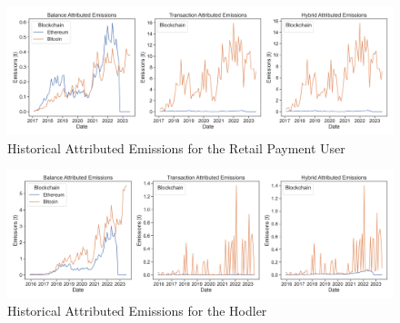 \documentclass[11pt]{report}
\begin{document}
\begin{figure}[h!]
    \centering
    \centerline{\includegraphics[scale=0.4]{figures/attributed_em_retailpaymentuser.png}}
    \caption{Historical Attributed Emissions for the Retail Payment User}
    \label{fig:attributed_investor}
\end{figure}
\begin{figure}[h!]
    \centering
    \centerline{\includegraphics[scale=0.4]{figures/attributed_em_thehodler.png}}
    \caption{Historical Attributed Emissions for the Hodler}
    \label{fig:attributed_investor}
\end{figure}
\end{document}
